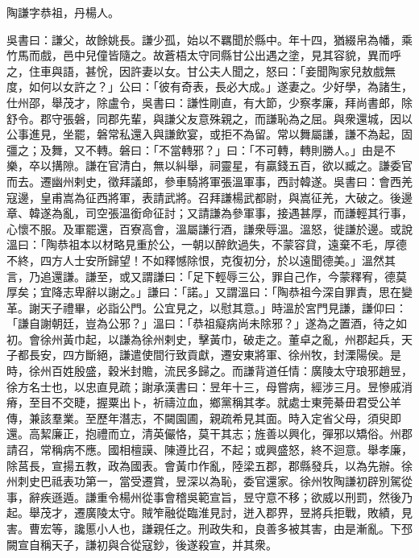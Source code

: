 
\begin{pinyinscope}
陶謙字恭祖，丹楊人。

吳書曰：謙父，故餘姚長。謙少孤，始以不羈聞於縣中。年十四，猶綴帛為幡，乘竹馬而戲，邑中兒僮皆隨之。故蒼梧太守同縣甘公出遇之塗，見其容貌，異而呼之，住車與語，甚恱，因許妻以女。甘公夫人聞之，怒曰：「妾聞陶家兒敖戲無度，如何以女許之？」公曰：「彼有奇表，長必大成。」遂妻之。少好學，為諸生，仕州邵，舉茂才，除盧令，吳書曰：謙性剛直，有大節，少察孝廉，拜尚書郎，除舒令。郡守張磐，同郡先輩，與謙父友意殊親之，而謙恥為之屈。與衆還城，因以公事進見，坐罷，磐常私還入與謙飲宴，或拒不為留。常以舞屬謙，謙不為起，固彊之；及舞，又不轉。磐曰：「不當轉邪？」曰：「不可轉，轉則勝人。」由是不樂，卒以搆隙。謙在官清白，無以糾舉，祠靈星，有贏錢五百，欲以臧之。謙委官而去。遷幽州剌史，徵拜議郎，參車騎將軍張溫軍事，西討韓遂。吳書曰：會西羌寇邊，皇甫嵩為征西將軍，表請武將。召拜謙楊武都尉，與嵩征羌，大破之。後邊章、韓遂為亂，司空張溫銜命征討；又請謙為參軍事，接遇甚厚，而謙輕其行事，心懷不服。及軍罷還，百寮高會，溫屬謙行酒，謙衆辱溫。溫怒，徙謙於邊。或說溫曰：「陶恭祖本以材略見重於公，一朝以醉飲過失，不蒙容貸，遠棄不毛，厚德不終，四方人士安所歸望！不如釋憾除恨，克復初分，於以遠聞德美。」溫然其言，乃追還謙。謙至，或又謂謙曰：「足下輕辱三公，罪自己作，今蒙釋宥，德莫厚矣；宜降志卑辭以謝之。」謙曰：「諾。」又謂溫曰：「陶恭祖今深自罪責，思在變革。謝天子禮畢，必詣公門。公宜見之，以慰其意。」時溫於宮門見謙，謙仰曰：「謙自謝朝廷，豈為公邪？」溫曰：「恭祖癡病尚未除邪？」遂為之置酒，待之如初。會徐州黃巾起，以謙為徐州剌史，擊黃巾，破走之。董卓之亂，州郡起兵，天子都長安，四方斷絕，謙遣使間行致貢獻，遷安東將軍、徐州牧，封溧陽侯。是時，徐州百姓殷盛，穀米封贍，流民多歸之。而謙背道任情：廣陵太守琅邪趙昱，徐方名士也，以忠直見疏；謝承漢書曰：昱年十三，母嘗病，經涉三月。昱慘戚消瘠，至目不交睫，握粟出卜，祈禱泣血，鄉黨稱其孝。就處士東莞綦毌君受公羊傳，兼該羣業。至歷年潛志，不闚園圃，親疏希見其面。時入定省父母，須臾即還。高絜廉正，抱禮而立，清英儼恪，莫干其志；旌善以興化，彈邪以矯俗。州郡請召，常稱病不應。國相檀謨、陳遵比召，不起；或興盛怒，終不迴意。舉孝廉，除莒長，宣揚五教，政為國表。會黃巾作亂，陸梁五郡，郡縣發兵，以為先辦。徐州刺史巴祗表功第一，當受遷賞，昱深以為恥，委官還家。徐州牧陶謙初辟別駕從事，辭疾遜遁。謙重令楊州從事會稽吳範宣旨，昱守意不移；欲威以刑罰，然後乃起。舉茂才，遷廣陵太守。賊笮融從臨淮見討，迸入郡界，昱將兵拒戰，敗績，見害。曹宏等，讒慝小人也，謙親任之。刑政失和，良善多被其害，由是漸亂。下邳闕宣自稱天子，謙初與合從寇鈔，後遂殺宣，并其衆。


\end{pinyinscope}

